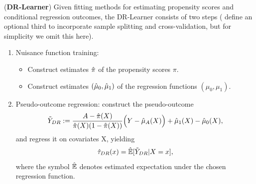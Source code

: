 \documentclass[../thesis.tex]{subfiles}
\begin{document}
\begin{technique}{(\textbf{DR-Learner})}
Given fitting methods for estimating propensity scores and conditional regression outcomes, the DR-Learner consists of two steps (\citet{kennedy_towards_2022} define an optional third to incorporate sample splitting and cross-validation, but for simplicity we omit this here).
\begin{enumerate}
    \item Nuisance function training:
    \begin{itemize}
        \item Construct estimates $\hat{\pi}$ of the propensity scores $\pi$.
        \item Construct estimates $(\hat{\mu}_0, \hat{\mu}_1)$ of the regression functions $(\mu_0, \mu_1)$.
    \end{itemize}
    \item Pseudo-outcome regression: construct the pseudo-outcome
    \[\Tilde{Y}_{DR} := \frac{A - \hat{\pi}(X)}{\hat{\pi}(X)(1-\hat{\pi}(X))}\Big( Y - \hat{\mu}_A(X)\Big) + \hat{\mu}_1(X) - \hat{\mu}_0(X),\]
    and regress it on covariates X, yielding
    \[\hat{\tau}_{DR}(x) = \hat{\mathbb{E}}[\Tilde{Y}_{DR} | X = x],\]
    where the symbol $\hat{\mathbb{E}}$ denotes estimated expectation under the chosen regression function.
\end{enumerate}
\end{technique}
\end{document}
